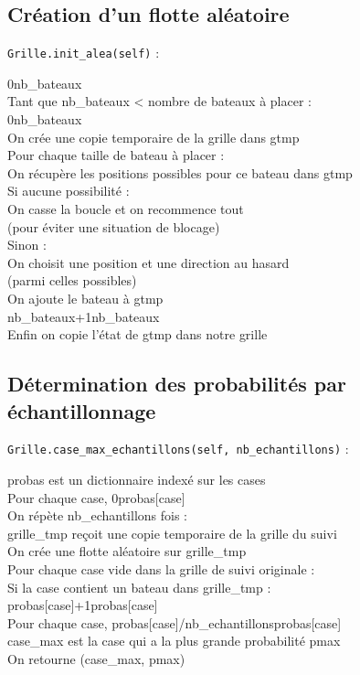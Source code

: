 \subsection{Création d'un flotte aléatoire}\label{init_alea}
\texttt{Grille.init\_alea(self)} :
\begin{algo1}
0\sto nb\_bateaux\\
Tant que nb\_bateaux < nombre de bateaux à placer :\\
 0\sto nb\_bateaux\\
 On crée une copie temporaire de la grille dans gtmp\\
 Pour chaque taille de bateau à placer :\\
 On récupère les positions possibles pour ce bateau dans gtmp\\
 Si aucune possibilité :\\
 On casse la boucle et on recommence tout\\
 (pour éviter une situation de blocage)\\
 Sinon :\\
 On choisit une position et une direction au hasard\\
 (parmi celles possibles)\\
 On ajoute le bateau à gtmp\\
 nb\_bateaux+1\sto nb\_bateaux\\
Enfin on copie l'état de gtmp dans notre grille \\
\end{algo1}

\subsection{Détermination des probabilités par échantillonnage}\label{case_max_echantillons}
\texttt{Grille.case\_max\_echantillons(self, nb\_echantillons)} :
\begin{algo1}
probas est un dictionnaire indexé sur les cases\\
Pour chaque case, 0\sto probas[case]\\
On répète nb\_echantillons fois :\\
grille\_tmp reçoit une copie temporaire de la grille du suivi\\
On crée une flotte aléatoire sur grille\_tmp\\
Pour chaque case vide dans la grille de suivi originale :\\
Si la case contient un bateau dans grille\_tmp :\\
probas[case]+1\sto probas[case]\\
Pour chaque case, probas[case]/nb\_echantillons\sto probas[case]\\
case\_max est la case qui a la plus grande probabilité pmax\\
On retourne (case\_max, pmax)\\
\end{algo1}

